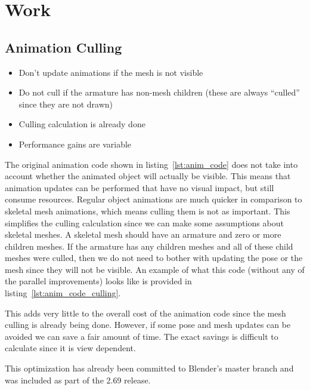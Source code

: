 \section{Work}

\subsection{Animation Culling}
\ifsummaries
\begin{itemize}
 \item Don't update animations if the mesh is not visible
 \item Do not cull if the armature has non-mesh children (these are always ``culled'' since they are not drawn)
 \item Culling calculation is already done
 \item Performance gains are variable
\end{itemize}
\fi

The original animation code shown in listing~\ref{lst:anim_code} does not take into account whether the animated object will actually be visible.
This means that animation updates can be performed that have no visual impact, but still consume resources.
Regular object animations are much quicker in comparison to skeletal mesh animations, which means culling them is not as important.
This simplifies the culling calculation since we can make some assumptions about skeletal meshes.
A skeletal mesh should have an armature and zero or more children meshes.
If the armature has any children meshes and all of these child meshes were culled, then we do not need to bother with updating the pose or the mesh since they will not be visible.
An example of what this code (without any of the parallel improvements) looks like is provided in listing~\ref{lst:anim_code_culling}.


This adds very little to the overall cost of the animation code since the mesh culling is already being done.
However, if some pose and mesh updates can be avoided we can save a fair amount of time.
The exact savings is difficult to calculate since it is view dependent.

This optimization has already been committed to Blender's master branch and was included as part of the 2.69 release.

